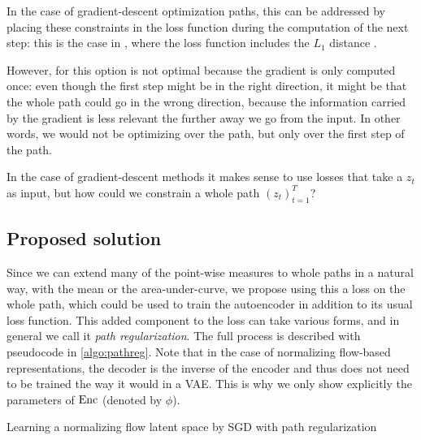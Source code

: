 \documentclass[../main.tex]{subfiles}
\begin{document}
In the case of gradient-descent optimization paths, this can be addressed by placing these constraints in the loss function during the computation of the next step: this is the case in \revise{}, where the loss function includes the $L_1$ distance \cite{joshiRealistic2019}.

However, for \ls{} this option is not optimal because the gradient is only computed once: even though the first step might be in the right direction, it might be that the whole path could go in the wrong direction, because the information carried by the gradient is less relevant the further away we go from the input.
In other words, we would not be optimizing over the path, but only over the first step of the path.

In the case of gradient-descent methods it makes sense to use losses that take a $z_t$ as input, but how could we constrain a whole path $(z_t)_{t=1}^T$?

\subsection{Proposed solution}

Since we can extend many of the point-wise measures to whole paths in a natural way, \eg{} with the mean or the area-under-curve, we propose using this a loss on the whole path, which could be used to train the autoencoder in addition to its usual loss function.
This added component to the loss can take various forms, and in general we call it \emph{path regularization}. The full process is described with pseudocode in \autoref{algo:pathreg}.
Note that in the case of normalizing flow-based representations, the decoder is the inverse of the encoder and thus does not need to be trained the way it would in a VAE. This is why we only show explicitly the parameters of $\operatorname{Enc}$ (denoted by $\phi$).

\begin{algorithm}
\caption{Learning a normalizing flow latent space by SGD with path regularization}
\label{algo:pathreg}
\end{algorithm}
\end{document}
